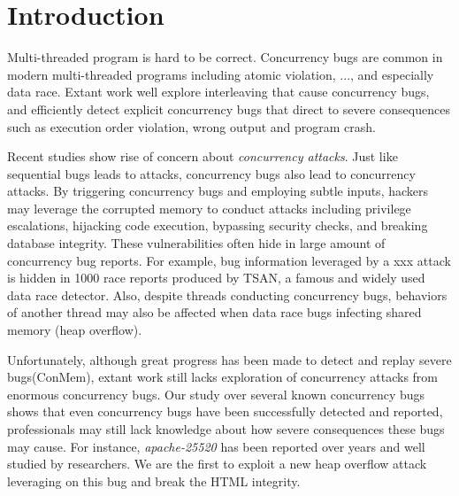\section{Introduction} \label{sec:intro}


Multi-threaded program is hard to be correct. 
Concurrency bugs are common in modern multi-threaded programs\cite{lu:concurrency-bugs,conmem:asplos10,conseq:asplos11, lu:muvi:sosp} 
including atomic violation, ..., and especially data race.
Extant work well explore interleaving that cause concurrency bugs, 
and efficiently detect explicit concurrency bugs that direct to  
severe consequences such as execution order violation, wrong output and program crash.

Recent studies\cite{acidrain:sigmod17,con:hotpar12} show rise of concern about \emph{concurrency attacks}.
Just like sequential bugs leads to attacks, concurrency bugs also lead to concurrency attacks. 
By triggering concurrency bugs and employing subtle inputs, 
hackers may leverage the corrupted memory to conduct  
attacks including privilege escalations\cite{}, hijacking code execution\cite{}, bypassing security checks\cite{}, 
and breaking database integrity\cite{acidrain:sigmod17}.
These vulnerabilities often hide in large amount of concurrency bug reports. 
For example, bug information leveraged by a xxx attack is hidden in 1000 race reports 
produced by TSAN\cite{tsan}, a famous and widely used data race detector. 
Also, despite threads conducting concurrency bugs, 
behaviors of another thread may also be affected when data race bugs infecting shared memory (\eg heap overflow)\cite{apache-bug-25520,}. 


Unfortunately, although great progress has been made to detect and replay severe bugs(\eg ConMem\cite{conmem:asplos10}), 
extant work still lacks exploration of concurrency attacks from enormous concurrency bugs. Our study over several known concurrency 
bugs\cite{apache-bug-25520, apache-bug-46215} shows that even concurrency bugs have been successfully detected and reported, 
professionals may still lack knowledge about how severe consequences these bugs may cause. 
For instance, \emph{apache-25520}\cite{apache-bug-25520} has been 
reported over years and well studied by researchers\cite{lu:concurrency-bugs}.  
We are the first to exploit a new heap overflow attack leveraging on this bug and break the HTML integrity.  

